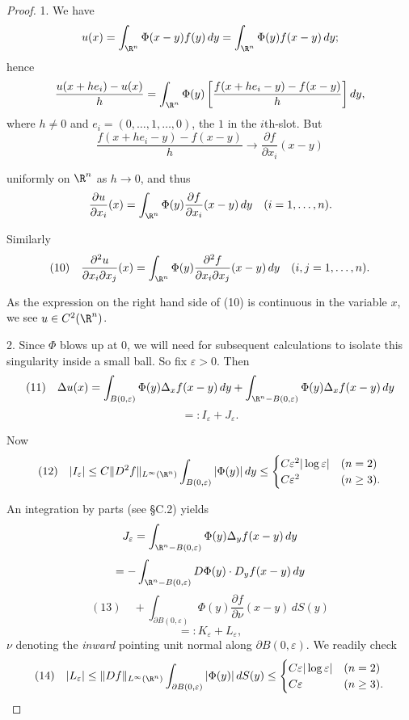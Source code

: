 \begin{proof}
1. We have
$$u(x) = \int_{\R^n}\Phi(x-y)f(y)\,dy = \int_{\R^n}\Phi(y)f(x-y)\,dy;$$
hence
$$\frac{u(x+he_i)-u(x)}{h} = \int_{\R^n}\Phi(y)\left[\frac{f(x+he_i-y)-f(x-y)}{h}\right]dy,$$
where $h \neq 0$ and $e_i = (0,\ldots,1,\ldots,0)$, the $1$ in the $i$th-slot. But
$$\frac{f(x+he_i-y)-f(x-y)}{h} \to \frac{\partial f}{\partial x_i}(x-y)$$

uniformly on $\R^n$ as $h \to 0$, and thus
$$\frac{\partial u}{\partial x_i}(x) = \int_{\R^n} \Phi(y)\frac{\partial f}{\partial x_i}(x-y)\,dy \quad (i=1,\ldots,n).$$

Similarly
$$(10) \quad \frac{\partial^2 u}{\partial x_i \partial x_j}(x) = \int_{\R^n} \Phi(y)\frac{\partial^2 f}{\partial x_i \partial x_j}(x-y)\,dy \quad (i,j=1,\ldots,n).$$

As the expression on the right hand side of (10) is continuous in the variable $x$, we see $u \in C^2(\R^n)$.

2. Since $\Phi$ blows up at $0$, we will need for subsequent calculations to isolate this singularity inside a small ball. So fix $\varepsilon > 0$. Then
$$(11) \quad \Delta u(x) = \int_{B(0,\varepsilon)} \Phi(y)\Delta_xf(x-y)\,dy + \int_{\R^n-B(0,\varepsilon)} \Phi(y)\Delta_xf(x-y)\,dy$$
$$=: I_\varepsilon + J_\varepsilon.$$

Now
$$(12) \quad |I_\varepsilon| \leq C\|D^2f\|_{L^\infty(\R^n)} \int_{B(0,\varepsilon)} |\Phi(y)|\,dy \leq \begin{cases} C\varepsilon^2|\log\varepsilon| & (n=2) \\ C\varepsilon^2 & (n \geq 3). \end{cases}$$

An integration by parts (see \S C.2) yields
$$J_\varepsilon = \int_{\R^n-B(0,\varepsilon)} \Phi(y)\Delta_yf(x-y)\,dy$$
$$= -\int_{\R^n-B(0,\varepsilon)} D\Phi(y)\cdot D_yf(x-y)\,dy$$
$$(13) \quad + \int_{\partial B(0,\varepsilon)} \Phi(y)\frac{\partial f}{\partial \nu}(x-y)\,dS(y)$$
$$=: K_\varepsilon + L_\varepsilon,$$
$\nu$ denoting the \textit{inward} pointing unit normal along $\partial B(0,\varepsilon)$. We readily check
$$(14) \quad |L_\varepsilon| \leq \|Df\|_{L^\infty(\R^n)} \int_{\partial B(0,\varepsilon)} |\Phi(y)|\,dS(y) \leq \begin{cases} C\varepsilon|\log\varepsilon| & (n=2) \\ C\varepsilon & (n \geq 3). \end{cases}$$


\end{proof}

